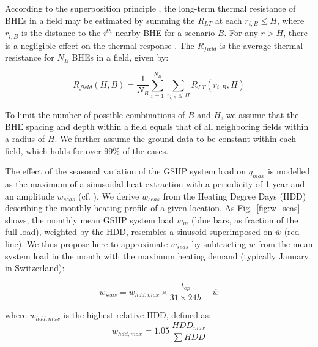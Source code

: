 According to the superposition principle \cite{eskilson_thermal_1987}, the long-term thermal resistance of BHEs in a field may be estimated by summing 
the $R_{LT}$ at each $r_{i,B} \leq H$, where $r_{i,B}$ is the distance to the $i^{th}$ nearby BHE for a scenario $B$.
For any $r > H$, there is a negligible effect on the thermal response \cite{pahud_geothermal_2002}. 
The $R_{field}$ is the average thermal resistance for $N_B$ BHEs in a field, given by:

\begin{equation}
\label{eq:R_field}
    R_{field}(H, B) = \frac{1}{N_B} \sum_{i=1}^{N_B} \sum_{r_{i,B} \leq H} R_{LT}(r_{i,B}, H)
\end{equation}

To limit the number of possible combinations of $B$ and $H$, we assume that the BHE spacing and depth within a field equals that of all neighboring fields within a radius of $H$.
We further assume the ground data to be constant within each field, which holds for over 99\% of the cases. 

The effect of the seasonal variation of the GSHP system load on $q_{max}$ is modelled as the maximum of a sinusoidal heat extraction with a periodicity of 1 year and an amplitude $w_{seas}$ (cf. \cite{pahud_geothermal_2002}). 
We derive $w_{seas}$ from the Heating Degree Days (HDD) describing the monthly heating profile of a given location.
As Fig.~\ref{fig:w_seas} shows, the monthly mean GSHP system load $\overline{w}_m$ (blue bars, as fraction of the full load), weighted by the HDD, resembles a sinusoid superimposed on $\overline{w}$ (red line).
We thus propose here to approximate $w_{seas}$ by subtracting $\overline{w}$ from the mean system load in the month with the maximum heating demand (typically January in Switzerland):

\begin{equation}
\label{eq:w_seas}
    w_{seas} = w_{hdd,max} \times \frac{t_{op}}{31\times24h} - \overline{w} %
\end{equation}

where $w_{hdd,max}$ is the highest relative HDD, defined as:
\begin{equation}
\label{eq:w_HDD}
    w_{hdd,max} = 1.05 \  \frac{HDD_{max}}{\sum HDD}
\end{equation}

